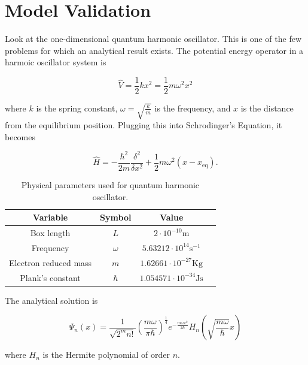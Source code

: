 \documentclass[12pt, a4paper, twocolumn]{article}
\begin{document}
\section{Model Validation}
\label{sec:modval}

Look at the one-dimensional quantum harmonic oscillator. This is one of the few problems for which an analytical result exists. The potential energy operator in a harmoic oscillator system is 

\begin{equation}
\hat{V} = \frac{1}{2}kx^2=\frac{1}{2}m\omega^2x^2
\end{equation}

where $k$ is the spring constant, $\omega = \sqrt{\frac{k}{m}}$ is the frequency, and $x$ is the distance from the equilibrium position. Plugging this into Schrodinger's Equation, it becomes

\begin{equation}
\hat{H} = -\frac{\hbar^2}{2m} \frac{\delta^2}{\delta x^2} +\frac{1}{2}m\omega ^2 (x-x_{\mathrm{eq}}).
\end{equation}

\begin{table}[t]\footnotesize
	\centering
	\caption{Physical parameters used for quantum harmonic oscillator.}
	\begin{tabular}{| c | c | c | c |}
	\hline
    Variable & Symbol & Value \\
    \hline 
    Box length & $L$ & $2\cdot 10^{-10} \mathrm{m}$ \\
    \hline 
    Frequency & $\omega$ & $5.63212\cdot 10^{14} \mathrm{s}^{-1}$ \\
    \hline 
    Electron reduced mass & $m$ & $1.62661\cdot 10^{-27} \mathrm{Kg}$ \\
    \hline 
    Plank's constant & $\hbar$ & $1.054571\cdot 10^{-34} \mathrm{Js}$ \\
    \hline
  \end{tabular}
\label{tab:physparam}
\end{table}

The analytical solution is

\begin{equation}
\Psi_n(x) = \frac{1}{\sqrt{2^m n!}} \left( \frac{m \omega}{\pi \hbar} \right)^{\frac{1}{4}} e^{ -\frac{m\omega x^2}{2\hbar} }H_n \left( \sqrt{\frac{m \omega}{\hbar}}x \right)
\end{equation}

where $H_n$ is the Hermite polynomial of order $n$.
\end{document}
